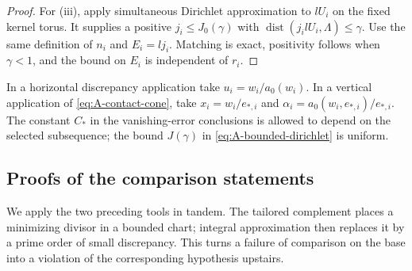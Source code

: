 \begin{proof}
For \textup{(iii)}, apply simultaneous Dirichlet approximation to
\(lU_i\) on the fixed kernel torus.  It supplies a positive
\(j_i\le J_0(\gamma)\) with
\(\operatorname{dist}(j_i lU_i,\Lambda)\le\gamma\).
Use the same definition of \(n_i\) and \(E_i=l j_i\).
Matching is exact, positivity follows when \(\gamma<1\), and the
bound on \(E_i\) is independent of \(r_i\).
\end{proof}

In a horizontal discrepancy application take \(u_i=w_i/a_0(w_i)\).
In a vertical application of \eqref{eq:A-contact-cone}, take
\(x_i=w_i/e_{*,i}\) and
\(\alpha_i=a_0(w_i,e_{*,i})/e_{*,i}\).
The constant \(C_*\) in the vanishing-error conclusions is allowed to
depend on the selected subsequence; the bound \(J(\gamma)\) in
\eqref{eq:A-bounded-dirichlet} is uniform.

\subsection{Proofs of the comparison statements}

We apply the two preceding tools in tandem.  The tailored complement
places a minimizing divisor in a bounded chart; integral approximation
then replaces it by a prime order of small discrepancy.  This turns a
failure of comparison on the base into a violation of the corresponding
hypothesis upstairs.

